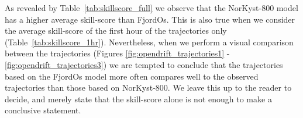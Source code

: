 \clearpage
As revealed by Table~\ref{tab:skillscore_full} we observe that the NorKyst-800 model has a higher average skill-score than FjordOs. This is also true when we consider the average skill-score of the first hour of the trajectories only (Table~\ref{tab:skillscore_1hr}). Nevertheless, when we perform a visual comparison between the trajectories (Figures \ref{fig:opendrift_trajectories1} - \ref{fig:opendrift_trajectories3}) we are tempted to conclude that the trajectories based on the FjordOs model more often compares well to the observed trajectories than those based on NorKyst-800. We leave this up to the reader to decide, and merely state that the skill-score alone is not enough to make a conclusive statement.

